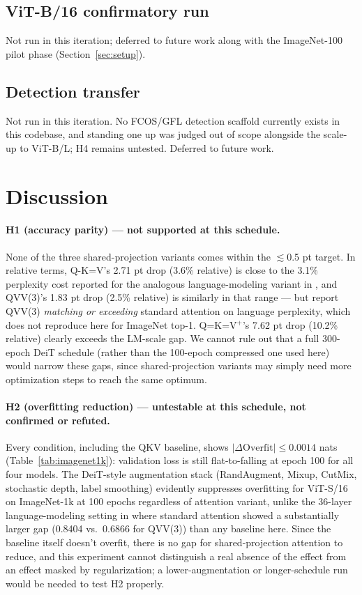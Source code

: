 \documentclass[11pt]{article}
\begin{document}
\subsection{ViT-B/16 confirmatory run}
Not run in this iteration; deferred to future work along with the
ImageNet-100 pilot phase (Section~\ref{sec:setup}).

\subsection{Detection transfer}
Not run in this iteration. No FCOS/GFL detection scaffold currently exists
in this codebase, and standing one up was judged out of scope alongside the
scale-up to ViT-B/L; H4 remains untested. Deferred to future work.

\section{Discussion}
\label{sec:discussion}

\paragraph{H1 (accuracy parity) --- not supported at this schedule.} None of
the three shared-projection variants comes within the \(\lesssim\)0.5 pt
target. In relative terms, Q-K=V's 2.71 pt drop (3.6\% relative) is close to
the 3.1\% perplexity cost reported for the analogous language-modeling
variant in \citet{kayyam2026three}, and QVV(3)'s 1.83 pt drop (2.5\%
relative) is similarly in that range --- but \citet{gao2026keyless} report
QVV(3) \emph{matching or exceeding} standard attention on language
perplexity, which does not reproduce here for ImageNet top-1. Q=K=V\(^+\)'s
7.62 pt drop (10.2\% relative) clearly exceeds the LM-scale gap. We cannot
rule out that a full 300-epoch DeiT schedule (rather than the 100-epoch
compressed one used here) would narrow these gaps, since shared-projection
variants may simply need more optimization steps to reach the same optimum.

\paragraph{H2 (overfitting reduction) --- untestable at this schedule, not
confirmed or refuted.} Every condition, including the QKV baseline, shows
\(|\Delta\text{Overfit}| \le 0.0014\) nats (Table~\ref{tab:imagenet1k}):
validation loss is still flat-to-falling at epoch 100 for all four models.
The DeiT-style augmentation stack (RandAugment, Mixup, CutMix, stochastic
depth, label smoothing) evidently suppresses overfitting for ViT-S/16 on
ImageNet-1k at 100 epochs regardless of attention variant, unlike the
36-layer language-modeling setting in \citet{gao2026keyless} where standard
attention showed a substantially larger gap (0.8404 vs.\ 0.6866 for QVV(3))
than any baseline here. Since the baseline itself doesn't overfit, there is
no gap for shared-projection attention to reduce, and this experiment cannot
distinguish a real absence of the effect from an effect masked by
regularization; a lower-augmentation or longer-schedule run would be needed
to test H2 properly.
\end{document}
